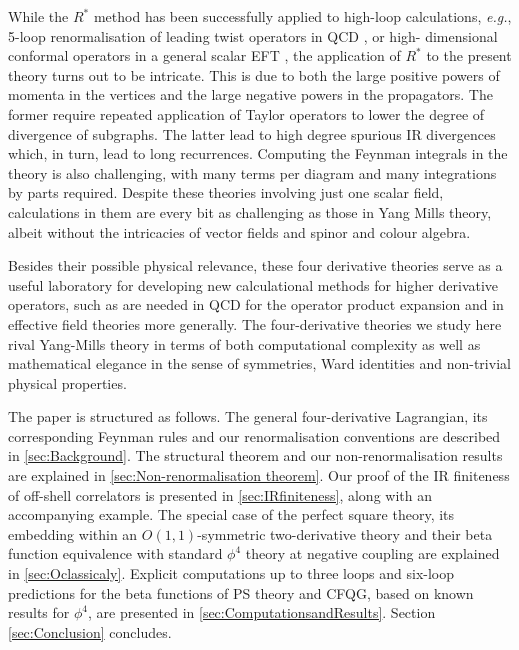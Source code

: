 \documentclass[a4paper,11pt]{article}
\begin{document}
While the $R^*$ method has been successfully applied to high-loop calculations, \emph{e.g.}, 5-loop renormalisation of leading twist operators in QCD \cite{Falcioni:2023luc,Falcioni:2023vqq,Falcioni:2024qpd,Falcioni:2024xav,Falcioni:2024xyt}, or high- dimensional conformal operators in a general scalar EFT  \cite{Henriksson:2025hwi}, the application of $R^*$ to the present theory turns out to be intricate. This is due to both the large positive powers of momenta in the vertices and the large negative powers in the propagators. The former require repeated application of Taylor operators to lower the degree of divergence of subgraphs. The latter lead to high degree spurious IR divergences which, in turn, lead to long recurrences. Computing the Feynman integrals in the theory is also challenging, with many terms per diagram and many integrations by parts required. Despite these theories involving just one scalar field, calculations in them are every bit as challenging as those in Yang Mills theory, albeit without the intricacies of vector fields and spinor and colour algebra. 

Besides their possible physical relevance, these four derivative theories serve as a useful laboratory for developing new calculational methods for higher derivative operators, such as are needed in QCD for the operator product expansion and in effective field theories more generally. The four-derivative theories we study here rival Yang-Mills theory in terms of both computational complexity as well as mathematical elegance in the sense of symmetries, Ward identities and non-trivial physical properties. 

The paper is structured as follows. The general four-derivative Lagrangian, its corresponding Feynman rules and our renormalisation conventions are described in  \cref{sec:Background}. The structural theorem and our non-renormalisation results are explained in \cref{sec:Non-renormalisation theorem}. Our proof of the IR finiteness of off-shell correlators is presented in \cref{sec:IRfiniteness}, along with an accompanying example. The special case of the perfect square theory, its embedding within an $O(1,1)$-symmetric two-derivative theory and their beta function equivalence with standard $\phi^4$ theory at negative coupling are explained in \cref{sec:Oclassicaly}. Explicit computations up to three loops and six-loop predictions for the beta functions of PS theory and CFQG, based on known results for $\phi^4$, are presented in \cref{sec:ComputationsandResults}. Section \ref{sec:Conclusion} concludes. 
\end{document}
